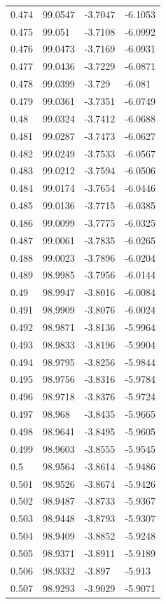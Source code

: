 \begin{tabular}{llll}
0.474 & 99.0547 & -3.7047 & -6.1053 \\
0.475 & 99.051 & -3.7108 & -6.0992 \\
0.476 & 99.0473 & -3.7169 & -6.0931 \\
0.477 & 99.0436 & -3.7229 & -6.0871 \\
0.478 & 99.0399 & -3.729 & -6.081 \\
0.479 & 99.0361 & -3.7351 & -6.0749 \\
0.48 & 99.0324 & -3.7412 & -6.0688 \\
0.481 & 99.0287 & -3.7473 & -6.0627 \\
0.482 & 99.0249 & -3.7533 & -6.0567 \\
0.483 & 99.0212 & -3.7594 & -6.0506 \\
0.484 & 99.0174 & -3.7654 & -6.0446 \\
0.485 & 99.0136 & -3.7715 & -6.0385 \\
0.486 & 99.0099 & -3.7775 & -6.0325 \\
0.487 & 99.0061 & -3.7835 & -6.0265 \\
0.488 & 99.0023 & -3.7896 & -6.0204 \\
0.489 & 98.9985 & -3.7956 & -6.0144 \\
0.49 & 98.9947 & -3.8016 & -6.0084 \\
0.491 & 98.9909 & -3.8076 & -6.0024 \\
0.492 & 98.9871 & -3.8136 & -5.9964 \\
0.493 & 98.9833 & -3.8196 & -5.9904 \\
0.494 & 98.9795 & -3.8256 & -5.9844 \\
0.495 & 98.9756 & -3.8316 & -5.9784 \\
0.496 & 98.9718 & -3.8376 & -5.9724 \\
0.497 & 98.968 & -3.8435 & -5.9665 \\
0.498 & 98.9641 & -3.8495 & -5.9605 \\
0.499 & 98.9603 & -3.8555 & -5.9545 \\
0.5 & 98.9564 & -3.8614 & -5.9486 \\
0.501 & 98.9526 & -3.8674 & -5.9426 \\
0.502 & 98.9487 & -3.8733 & -5.9367 \\
0.503 & 98.9448 & -3.8793 & -5.9307 \\
0.504 & 98.9409 & -3.8852 & -5.9248 \\
0.505 & 98.9371 & -3.8911 & -5.9189 \\
0.506 & 98.9332 & -3.897 & -5.913 \\
0.507 & 98.9293 & -3.9029 & -5.9071 \\

\end{tabular}
